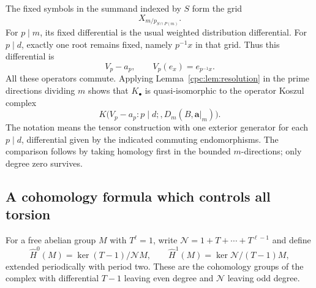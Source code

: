 \documentclass[11pt,a4paper]{article}
\numberwithin{equation}{section}
\theoremstyle{definition}
\theoremstyle{remark}
\begin{document}
The fixed symbols in the summand indexed by $S$ form the grid
\[
 X_{m/p_{S\cap P(m)}}.
\]
For $p\mid m$, its fixed differential is the usual weighted
distribution differential. For $p\mid d$, exactly one root remains
fixed, namely $p^{-1}x$ in that grid. Thus this differential is
\begin{equation}\label{cpc:eq:fixedoperator}
 V_p-a_p,\qquad V_p(e_x)=e_{p^{-1}x}.
\end{equation}
All these operators commute. Applying Lemma~\ref{cpc:lem:resolution}
in the prime directions dividing $m$ shows that $K_\bullet$ is
quasi-isomorphic to the operator Koszul complex
\begin{equation}\label{cpc:eq:operatorKoszul}
 K\bigl(V_p-a_p:p\mid d;,D_m(B,\mathbf a|_m)\bigr).
\end{equation}
The notation means the tensor construction with one exterior
generator for each $p\mid d$, differential given by the indicated
commuting endomorphisms. The comparison follows by taking homology
first in the bounded $m$-directions; only degree zero survives.

\subsection{A cohomology formula which controls all torsion}

For a free abelian group $M$ with $T^\ell=1$, write
$\mathcal N=1+T+\cdots+T^{\ell-1}$ and define
\[
 \widehat H^0(M)=\ker(T-1)/\mathcal N M,
 \qquad
 \widehat H^1(M)=\ker\mathcal N/(T-1)M,
\]
extended periodically with period two. These are the cohomology
groups of the complex with differential $T-1$ leaving even degree
and $\mathcal N$ leaving odd degree.
\end{document}
